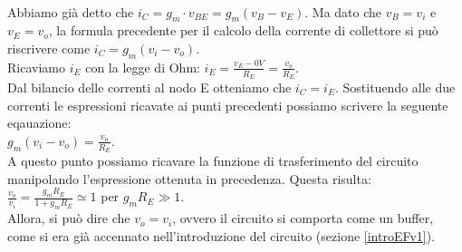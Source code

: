 \documentclass{report}
\begin{document}
\\Abbiamo già detto che $i_C=g_m\cdot v_{BE} = g_m(v_B-v_E) $. Ma dato che $v_B=v_i$ e $v_E=v_o$, la formula precedente per il calcolo della corrente di collettore si può riscrivere come $i_C=g_m(v_i-v_o)$.
\\[2pt]Ricaviamo $i_E$ con la legge di Ohm: 
$\displaystyle{i_E=\frac{v_E-0V}{R_E}=\frac{v_o}{R_E}}$.
\\[2 pt] Dal bilancio delle correnti al nodo E otteniamo che $i_C=i_E$. Sostituendo alle due correnti le espressioni ricavate ai punti precedenti possiamo scrivere la seguente eqauazione:
\\[2pt]\indent $\displaystyle{g_m(v_i-v_o)=\frac{v_o}{R_E}}$.
\\[2pt] A questo punto possiamo ricavare la funzione di trasferimento del circuito manipolando l'espressione ottenuta in precedenza. Questa risulta:
\\[2pt]\indent $\displaystyle{\frac{v_o}{v_i}=\frac{g_mR_E}{1+g_mR_E}\simeq1}$ per $g_mR_E\gg 1$. 
\\[2pt]Allora, si può dire che $v_o=v_i$, ovvero il circuito si comporta come un buffer, come si era già accennato nell'introduzione del circuito (sezione \ref{introEFv1}).
\end{document}
